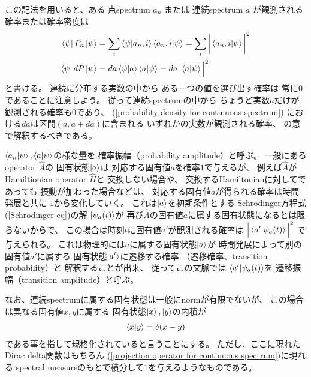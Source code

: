 この記法を用いると、ある
点spectrum $a_n$
または
連続spectrum $a$
が観測される確率または確率密度は
\begin{subequations}
\begin{align}
    \bra{ \psi }
        P_n
    \ket{ \psi }
    &=
    \sum_i
    \braket{ \psi | a_n, i }
    \braket{ a_n, i | \psi }
    =
    \sum_i
    \bigg|
        \braket{ a_n, i | \psi }
    \bigg|^2
\\
    \bra{ \psi }
        d P
    \ket{ \psi }
    &=
    d a
    \braket{ \psi | a }
    \braket{ a | \psi }
    =
    d a
    \Big|
        \braket{ a | \psi }
    \Big|^2
\label{probability density for continuous spectrum}
\end{align}
\end{subequations}
と書ける。
連続に分布する実数の中から
ある一つの値を選び出す確率は
常に$0$であることに注意しよう。
従って連続spectrumの中から
ちょうど実数$a$だけが観測される確率も$0$であり、
(\ref{probability density for continuous spectrum})
における$da$は区間$(a, a + da)$に含まれる
いずれかの実数が観測される確率、
の意で解釈するべきである。

$\braket{ a_n | \psi },
\braket{ a | \psi }$の様な量を
確率振幅（probability amplitude）と呼ぶ。
一般にあるoperator $\hat{A}$の
固有状態$\ket{a}$は
対応する固有値$a$を確率$1$で与えるが、
例えば$\hat{A}$が
Hamiltionian operator $\hat{H}$と
交換しない場合や、
交換するHamiltonianに対してであっても
摂動が加わった場合などは、
対応する固有値$a$が得られる確率は時間発展と共に
$1$から変化していく。
これは$\ket{a}$を初期条件とする
Schr\"odinger方程式(\ref{Schrodinger eq})の解
$\ket{\psi_a(t)}$が
再び$\hat{A}$の固有値$a$に属する固有状態になるとは限らないからで、
この場合は時刻$t$に固有値$a'$が観測される確率は
$\Big| \braket{ a' | \psi_a(t) } \Big|^2$
で与えられる。
これは物理的には$a$に属する固有状態$\ket{a}$が
時間発展によって別の固有値$a'$に属する
固有状態$\ket{a'}$に遷移する確率
（遷移確率、transition probability）と
解釈することが出来、
従ってこの文脈では
$\braket{ a' | \psi_a(t) }$を
遷移振幅（transition amplitude）と呼ぶ。

なお、連続spectrumに属する固有状態は一般にnormが有限でないが、
この場合は異なる固有値$x, y$に属する
固有状態$\ket{x}, \ket{y}$の内積が
\begin{align}
    \braket{x|y} = \delta(x-y)
\label{continuous spectrum normalization}
\end{align}
である事を指して規格化されていると言うことにする。
ただし、ここに現れたDirac delta関数はもちろん
(\ref{projection operator for continuous spectrum})に現れる
spectral measureのもとで積分して$1$を与えるようなものである。

